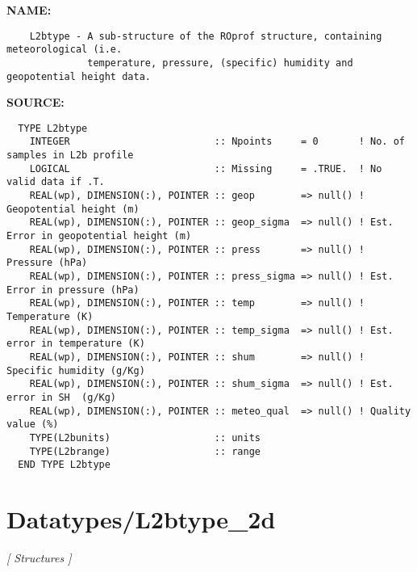 \label{ch:robo41}
\label{ch:Datatypes_L2btype}
\textbf{NAME:}\hspace{0.08in}\begin{Verbatim}
    L2btype - A sub-structure of the ROprof structure, containing meteorological (i.e.
              temperature, pressure, (specific) humidity and geopotential height data.
\end{Verbatim}
\textbf{SOURCE:}\hspace{0.08in}\begin{Verbatim}
  TYPE L2btype
    INTEGER                         :: Npoints     = 0       ! No. of samples in L2b profile
    LOGICAL                         :: Missing     = .TRUE.  ! No valid data if .T.
    REAL(wp), DIMENSION(:), POINTER :: geop        => null() ! Geopotential height (m)
    REAL(wp), DIMENSION(:), POINTER :: geop_sigma  => null() ! Est. Error in geopotential height (m)
    REAL(wp), DIMENSION(:), POINTER :: press       => null() ! Pressure (hPa)
    REAL(wp), DIMENSION(:), POINTER :: press_sigma => null() ! Est. Error in pressure (hPa)
    REAL(wp), DIMENSION(:), POINTER :: temp        => null() ! Temperature (K)
    REAL(wp), DIMENSION(:), POINTER :: temp_sigma  => null() ! Est. error in temperature (K)
    REAL(wp), DIMENSION(:), POINTER :: shum        => null() ! Specific humidity (g/Kg)
    REAL(wp), DIMENSION(:), POINTER :: shum_sigma  => null() ! Est. error in SH  (g/Kg)
    REAL(wp), DIMENSION(:), POINTER :: meteo_qual  => null() ! Quality value (%)
    TYPE(L2bunits)                  :: units
    TYPE(L2brange)                  :: range
  END TYPE L2btype
\end{Verbatim}
\section{Datatypes/L2btype\_2d}
\textsl{[ Structures ]}

